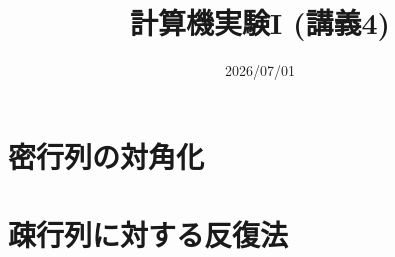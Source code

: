 \documentclass[10pt,dvipdfmx]{beamer}
\title{計算機実験I (講義4)}
\date{2026/07/01}
\begin{document}
\begin{frame}
  \titlepage
  \tableofcontents
\end{frame}

\section{密行列の対角化}


%

%











%


\section{疎行列に対する反復法}

%











% 
% 





\section{}

\end{document}
